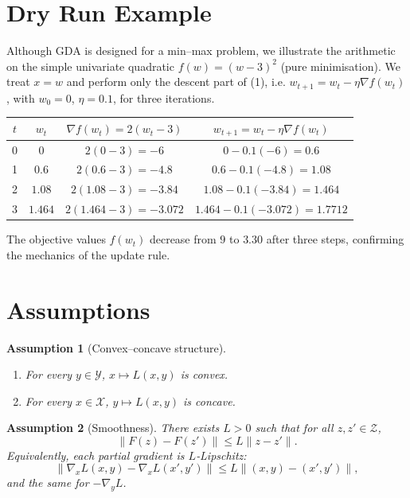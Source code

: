 \documentclass{article}
\newtheorem{assumption}{Assumption}
\begin{document}
\section*{Dry Run Example}
Although GDA is designed for a min–max problem, we illustrate the arithmetic on the simple
univariate quadratic $f(w)=(w-3)^{2}$ (pure minimisation).  
We treat $x=w$ and perform only the descent part of (1), i.e. $w_{t+1}=w_{t}-\eta\nabla f(w_{t})$,
with $w_{0}=0$, $\eta=0.1$, for three iterations.

\begin{center}
\begin{tabular}{c|c|c|c}
$t$ & $w_{t}$ & $\nabla f(w_{t})=2(w_{t}-3)$ & $w_{t+1}=w_{t}-\eta\nabla f(w_{t})$\\\hline
0 & $0$ & $2(0-3)=-6$ & $0-0.1(-6)=0.6$\\
1 & $0.6$ & $2(0.6-3)=-4.8$ & $0.6-0.1(-4.8)=1.08$\\
2 & $1.08$ & $2(1.08-3)=-3.84$ & $1.08-0.1(-3.84)=1.464$\\
3 & $1.464$ & $2(1.464-3)=-3.072$ & $1.464-0.1(-3.072)=1.7712$
\end{tabular}
\end{center}

The objective values $f(w_{t})$ decrease from $9$ to $3.30$ after three steps, confirming the
mechanics of the update rule.

\newpage

\section*{Assumptions}
\begin{assumption}[Convex–concave structure]\label{ass:cc}
\begin{enumerate}[label=(\alph*)]
\item For every $y\in\mathcal Y$, $x\mapsto L(x,y)$ is convex.
\item For every $x\in\mathcal X$, $y\mapsto L(x,y)$ is concave.
\end{enumerate}
\end{assumption}

\begin{assumption}[Smoothness]\label{ass:smooth}
There exists $L>0$ such that for all $z,z'\in\mathcal Z$,
\[
\|F(z)-F(z')\|\le L\|z-z'\| .
\tag{3}
\]
Equivalently, each partial gradient is $L$‑Lipschitz:
\[
\|\nabla_{x}L(x,y)-\nabla_{x}L(x',y')\|\le L\|(x,y)-(x',y')\|,
\]
and the same for $-\nabla_{y}L$.
\end{assumption}
\end{document}
